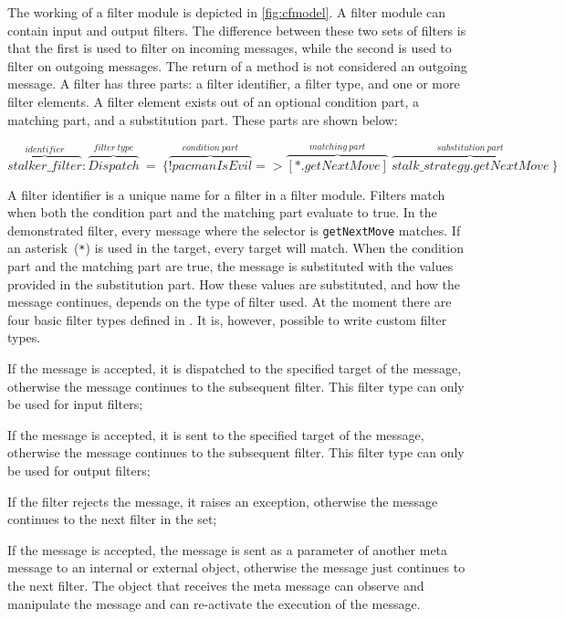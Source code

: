 The working of a filter module is depicted in \autoref{fig:cfmodel}.
A filter module can contain input and output filters.
The difference between these two sets of filters is that the first is used to filter on incoming messages, while the second is used to filter on outgoing messages.
The return of a method is not considered an outgoing message.
A filter has three parts: a filter identifier, a filter type, and one or more filter elements.
A filter element exists out of an optional condition part, a matching part, and a substitution part.
These parts are shown below:
\begin{center}
$\overbrace{stalker\_filter}^{identifier}:\overbrace{Dispatch}^{filter~type}~=~\{\overbrace{!pacmanIsEvil}^{condition~part}
=>\overbrace{[*.getNextMove]}^{matching~part}~\overbrace{stalk\_strategy.getNextMove}^{substitution~part}~\}$
\end{center}
A filter identifier is a unique name for a filter in a filter module. 
Filters match when both the condition part and the matching part evaluate to true.
In the demonstrated filter, every message where the selector is \lstinline|getNextMove| matches.
If an asterisk~(\lstinline|*|) is used in the target, every target will match.
When the condition part and the matching part are true, the message is substituted with the values provided in the substitution part.
How these values are substituted, and how the message continues, depends on the type of  filter used.
\newpage
At the moment there are four basic filter types defined in \Compose*.
It is, however, possible to write custom filter types.
\begin{description}[style=sameline,leftmargin=18mm]
  \item[Dispatch] If the message is accepted, it is dispatched to the specified target of the message, otherwise the message continues to the subsequent filter.
    This filter type can only be used for input filters;
  \item[Send] If the message is accepted, it is sent to the specified target of the message, otherwise the message continues to the subsequent filter.
    This filter type can only be used for output filters;
  \item[Error] If the filter rejects the message, it raises an exception, otherwise the message continues to the next filter in the set;
  \item[Meta] If the message is accepted, the message is sent as a parameter of another meta message to an internal or external object, otherwise the message just continues to the next filter.
    The object that receives the meta message can observe and manipulate the message and can re-activate the execution of the message.
\end{description}

